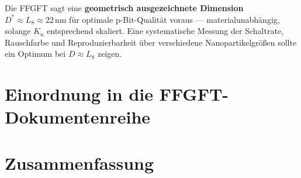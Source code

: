 	\begin{keypoint}
		Die FFGFT sagt eine \textbf{geometrisch ausgezeichnete Dimension}
		$D^* \approx L_8 \approx 22\,\text{nm}$ für optimale p-Bit-Qualität
		voraus --- materialunabhängig, solange $K_u$ entsprechend skaliert.
		Eine systematische Messung der Schaltrate, Rauschfarbe und
		Reproduzierbarkeit über verschiedene Nanopartikelgrößen sollte
		ein Optimum bei $D \approx L_8$ zeigen.
	\end{keypoint}
	
	\section{Einordnung in die FFGFT-Dokumentenreihe}
	\label{sec:einordnung}
	
	\begin{center}
	{\footnotesize
	} %
\end{center}
	
	\section{Zusammenfassung}
	\label{sec:zusammenfassung}
	

